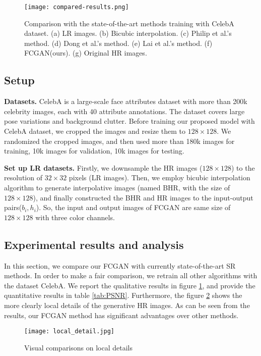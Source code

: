 \documentclass[conference,compsoc]{IEEEtran}
\newcommand\embf{\textbf}
\begin{document}
\begin{figure}[h]
  \centering
  \texttt{[image: compared-results.png]}
  \caption{Comparison with the state-of-the-art methods training with CelebA dataset. (a) LR images. (b) Bicubic interpolation. (c) Philip et al.'s method\cite{pix2pix}. (d) Dong et al.'s method\cite{dong2016accelerating}. (e) Lai et al.'s method\cite{LapSRN_CVPR2017}. (f) FCGAN(ours). (g) Original HR images.}
  \label{Fig:comparison}
\end{figure}

\subsection{Setup}
\embf{Datasets.} CelebA\cite{liu2015Celeba} is a large-scale face attributes dataset with more than 200k celebrity images, each with 40 attribute annotations. The dataset covers large pose variations and background clutter. Before training our proposed model with CelebA dataset, we cropped the images and resize them to $128\times128$. We randomized the cropped images, and then used more than 180k images for training, 10k images for validation, 10k images for testing.

\embf{Set up LR datasets.} Firstly, we downsample the HR images ($128 \times 128$) to the resolution of $32\times32$ pixels (LR images). Then, we employ bicubic interpolation algorithm to generate interpolative images (named BHR, with the size of $128\times128$), and finally constructed the BHR and HR images to the input-output pairs($b_{i},h_{i}$). So, the input and output images of FCGAN are same size of $128\times128$ with three color channels.

\subsection{Experimental results and analysis}

In this section, we compare our FCGAN with currently state-of-the-art SR methods. In order to make a fair comparison, we retrain all other algorithms with the dataset CelebA. We report the qualitative results in figure \ref{Fig:comparison}, and provide the quantitative results in table \ref{tab:PSNR}. Furthermore, the figure \ref{Fig:local_details} shows the more clearly local details of the generative HR images. As can be seen from the results, our FCGAN method has significant advantages over other methods.



\begin{figure}[h]
  \centering
  \texttt{[image: local\_detail.jpg]}
  \caption{Visual comparisons on local details}
  \label{Fig:local_details}
\end{figure}
\end{document}
